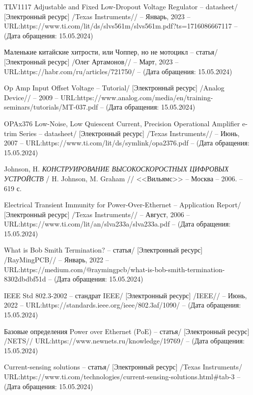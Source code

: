 \begin{thebibliography}{00}
 TLV1117 Adjustable and Fixed Low-Dropout Voltage Regulator
  -- datasheet/
  [Электронный ресурс] /Texas Instruments// -- Январь, 2023 -- 
  URL:https://www.ti.com/lit/ds/slvs561m/slvs561m.pdf?ts=1716086667117
  -- (Дата обращения: 15.05.2024)

 Маленькие китайские хитрости, или Чоппер, но не мотоцикл
-- статья/
[Электронный ресурс] /Олег Артамонов// -- Март, 2023 -- 
URL:https://habr.com/ru/articles/721750/
-- (Дата обращения: 15.05.2024)

 Op Amp Input Offset Voltage 
-- Tutorial/
[Электронный ресурс] /Analog Device// --  2009 -- 
URL:https://www.analog.com/media/en/training-seminars/tutorials/MT-037.pdf
-- (Дата обращения: 15.05.2024)

 OPAx376 Low-Noise, Low Quiescent Current, Precision Operational Amplifier
e-trim Series
-- datasheet/
[Электронный ресурс] /Texas Instruments// -- Июнь, 2007 -- 
URL:https://www.ti.com/lit/ds/symlink/opa2376.pdf
-- (Дата обращения: 15.05.2024)

 Johnson, H.
\emph{КОНСТРУИРОВАНИЕ ВЫСОКОСКОРОСТНЫХ ЦИФРОВЫХ УСТРОЙСТВ} / H. Johnson, M. Graham // <<Вильямс>> --
Москва -- 2006. -- 619 с.

 Electrical Transient Immunity for 
Power-Over-Ethernet
-- Application Report/
[Электронный ресурс] /Texas Instruments// -- Август, 2006 -- 
URL:https://www.ti.com/lit/an/slva233a/slva233a.pdf
-- (Дата обращения: 15.05.2024)

 What is Bob Smith Termination?
-- статья/
[Электронный ресурс] /RayMingPCB// -- Январь, 2022 -- 
URL:https://medium.com/@raymingpcb/what-is-bob-smith-termination-8302dbdbf51d
-- (Дата обращения: 15.05.2024)


 IEEE Std 802.3-2002
-- стандрат IEEE/
[Электронный ресурс] /IEEE// -- Июнь, 2022 -- 
URL:https://standards.ieee.org/ieee/802.3af/1090/
-- (Дата обращения: 15.05.2024)

 Базовые определения Power over Ethernet (PoE)
-- статья/
[Электронный ресурс] /NETS// 
URL:https://www.newnets.ru/knowledge/19769/
-- (Дата обращения: 15.05.2024)


 Current-sensing solutions
-- статья/
[Электронный ресурс] /Texas Instruments/ 
URL:https://www.ti.com/technologies/current-sensing-solutions.html\#tab-3
-- (Дата обращения: 15.05.2024)


\end{thebibliography}
